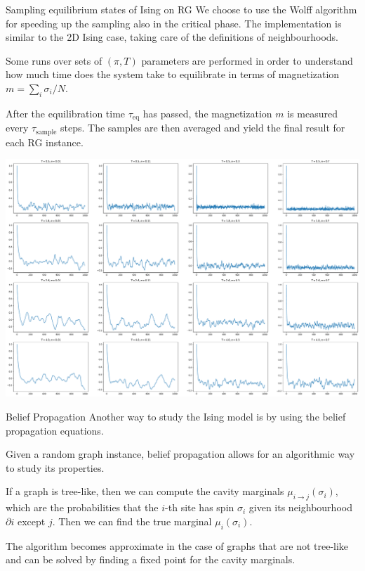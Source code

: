 \documentclass[handout]{beamer}
\begin{document}
\begin{frame}{Sampling equilibrium states of Ising on RG}
    We choose to use the \alert{Wolff algorithm} for speeding up the sampling
    also in the critical phase. The implementation is similar to the 2D Ising
    case, taking care of the definitions of neighbourhoods.

    Some runs over sets of $(\pi, T)$ parameters are performed in order to
    understand how much time does the system take to equilibrate in terms of
    magnetization $m=\sum_i \sigma_i / N$.

    After the equilibration time $\tau_{\text{eq}}$ has passed, the
    magnetization $m$ is measured every $\tau_{\text{sample}}$ steps. The
    samples are then averaged and yield the final result for each RG instance.
\end{frame}

\begin{frame}[plain]
    \includegraphics[width=\textwidth]{wolff_mags}
\end{frame}

\begin{frame}{Belief Propagation}
    Another way to study the Ising model is by using the \alert{belief
    propagation} equations.

    Given a random graph instance, belief propagation allows for an
    \alert{algorithmic} way to study its properties.

    If a graph is tree-like, then we can compute the \alert{cavity marginals}
    $\mu_{i\to j}(\sigma_i)$, which are the probabilities that the $i$-th site
    has spin $\sigma_i$ given its neighbourhood $\partial i$ except $j$.
    Then we can find the \alert{true marginal} $\mu_i(\sigma_i)$.

    The algorithm becomes approximate in the case of graphs that are not
    tree-like and can be solved by finding a fixed point for the cavity
    marginals.
\end{frame}
\end{document}
